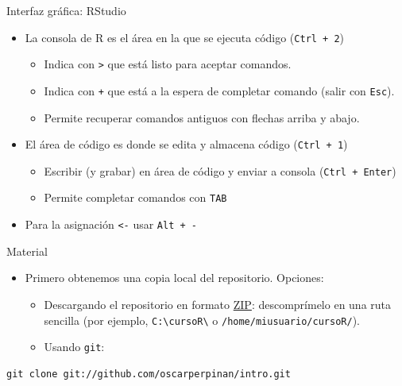 \documentclass[xcolor={usenames,svgnames,dvipsnames}]{beamer}
\begin{document}
\begin{frame}[fragile,label=sec-1-1-2]{Interfaz gráfica: RStudio}
 \begin{itemize}
\item La consola de R es el área en la que se ejecuta código (\texttt{Ctrl + 2})
\begin{itemize}
\item Indica con \texttt{>} que está listo para aceptar comandos.
\item Indica con \texttt{+} que está a la espera de completar comando (salir con \texttt{Esc}).
\item Permite recuperar comandos antiguos con flechas arriba y abajo.
\end{itemize}
\item El área de código es donde se edita y almacena código (\texttt{Ctrl + 1})
\begin{itemize}
\item Escribir (y grabar) en área de código y enviar a consola (\texttt{Ctrl + Enter})
\item Permite completar comandos con \texttt{TAB}
\end{itemize}
\item Para la asignación \texttt{<-} usar \texttt{Alt + -}
\end{itemize}
\end{frame}

\begin{frame}[fragile,label=sec-1-1-3]{Material}
 \begin{itemize}
\item Primero obtenemos una copia local del repositorio. Opciones:

\begin{itemize}
\item Descargando el repositorio en formato \href{https://github.com/oscarperpinan/intro/archive/master.zip}{ZIP}: descomprímelo en una ruta sencilla (por ejemplo, \texttt{C:\textbackslash{}cursoR\textbackslash{}} o \texttt{/home/miusuario/cursoR/}).

\item Usando \texttt{git}:
\end{itemize}
\end{itemize}
\lstset{language=sh,label= ,caption= ,numbers=none}
\begin{lstlisting}
git clone git://github.com/oscarperpinan/intro.git
\end{lstlisting}
\end{frame}
\end{document}
